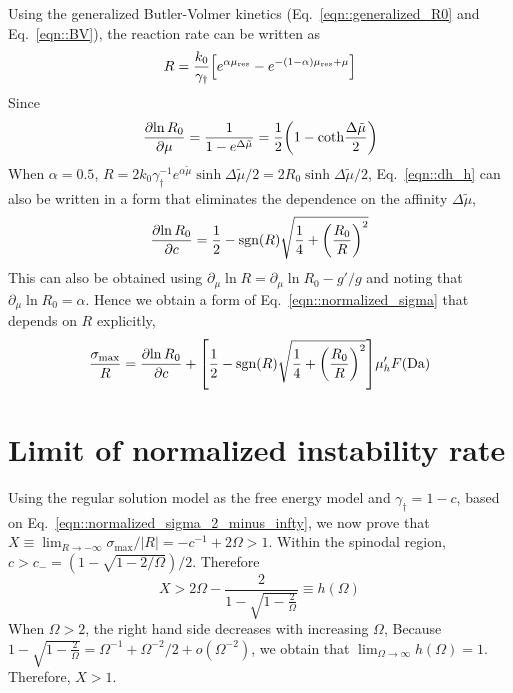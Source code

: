 \documentclass[reprint,aps,pre,superscriptaddress]{revtex4-2}
\newcommand{\pderiv}[2]{\frac{\partial {#1}}{\partial {#2}}}
\let\originalleft\left
\let\originalright\right
\renewcommand{\left}{\mathopen{}\mathclose\bgroup\originalleft}
\renewcommand{\right}{\aftergroup\egroup\originalright}
\begin{document}
Using the generalized Butler-Volmer kinetics (Eq.~\ref{eqn::generalized_R0} and Eq.~\ref{eqn::BV}), the reaction rate can be written as
\begin{equation}
  R = \frac{k_0}{\gamma_\dagger} \left[ e^{\alpha\mu_\text{res}}-e^{-(1-\alpha)\mu_\text{res}+\mu} \right]
\end{equation}
Since
\begin{equation} \label{eqn::dh_h}
  \pderiv{\ln{R_0}}{\mu}  = \frac{1}{1-e^{\Delta \tilde{\mu}}} = \frac{1}{2} \left( 1- \text{coth}\frac{\Delta \tilde{\mu}}{2} \right)
\end{equation}
When $\alpha=0.5$, $R=2 k_0 \gamma_\dagger^{-1} e^{\alpha\tilde{\mu}}\sinh{\Delta \tilde{\mu}/2}=2R_0\sinh{\Delta \tilde{\mu}/2}$,
Eq.~\ref{eqn::dh_h} can also be written in a form that eliminates the dependence on the affinity $\Delta \tilde{\mu}$,
\begin{equation} \label{eqn::dh_h_alt}
  \pderiv{\ln{R_0}}{c}  = \frac{1}{2} - \text{sgn}(R) \sqrt{\frac{1}{4}+\left(\frac{R_0}{R}\right)^2 }
\end{equation}
This can also be obtained using $\partial_\mu \ln{R} = \partial_\mu \ln{R_0} - g'/g$ and noting that $ \partial_\mu \ln{R_0} =\alpha$.
Hence we obtain a form of Eq.~\ref{eqn::normalized_sigma} that depends on $R$ explicitly,
\begin{equation} \label{eqn::normalized_sigma_generalized_BV}
  \frac{\sigma_\text{max}}{R} =  \pderiv{\ln{R_0}}{c} + \left[ \frac{1}{2} -  \text{sgn}(R) \sqrt{\frac{1}{4}+\left(\frac{R_0}{R}\right)^2} \right] \mu_h' F(\text{Da})
\end{equation}

\section{Limit of normalized instability rate}
\label{appendix:limit}
Using the regular solution model as the free energy model and $\gamma_\dagger=1-c$, based on Eq.~\ref{eqn::normalized_sigma_2_minus_infty},
we now prove that $X \equiv \lim_{R\to-\infty}{\sigma_\text{max}/|R|}=-c^{-1}+2\Omega>1$.
Within the spinodal region, $c>c_- = (1-\sqrt{1-2/\Omega})/2$. Therefore
\begin{equation}
  X > 2\Omega - \frac{2}{1-\sqrt{1-\frac{2}{\Omega}}} \equiv h(\Omega)
\end{equation}
When $\Omega>2$, the right hand side decreases with increasing $\Omega$,
Because $1-\sqrt{1-\frac{2}{\Omega}}=\Omega^{-1}+\Omega^{-2}/2+o(\Omega^{-2})$, we obtain that $\lim_{\Omega\to\infty}{h(\Omega)}=1$. Therefore, $X>1$.
\end{document}
